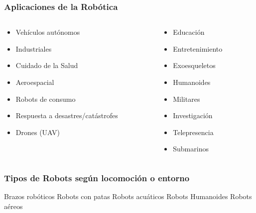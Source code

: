 \begin{frame}
    \frametitle{Aplicaciones de la Robótica}

    \begin{columns}[T] %
        \begin{column}{.48\textwidth}
            \begin{itemize}
                \item Vehículos autónomos
                \item Industriales
                \item Cuidado de la Salud
                \item Aeroespacial
                \item Robots de consumo
                \item Respuesta a desastres/catástrofes
                \item Drones (UAV)
            \end{itemize}
        \end{column}%
        \hfill%
        \begin{column}{.48\textwidth}
            \begin{itemize}
                \item Educación
                \item Entretenimiento
                \item Exoesqueletos
                \item Humanoides
                \item Militares
                \item Investigación
                \item Telepresencia
                \item Submarinos
            \end{itemize}
        \end{column}%
    \end{columns}


\end{frame}

\begin{frame}
    \frametitle{Tipos de Robots según locomoción o entorno}

    Brazos robóticos
    Robots con patas
    Robots acuáticos
    Robots Humanoides
    Robots aéreos

\end{frame}


